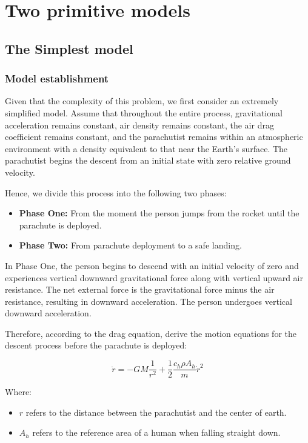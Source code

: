 \documentclass[12pt]{article}
\begin{document}
\section{Two primitive models}

\subsection{The Simplest model}

\subsubsection{Model establishment}

Given that the complexity of this problem, 
we first consider an extremely simplified model.  
Assume that throughout the entire process, gravitational acceleration remains constant, air density 
remains constant, the air drag coefficient remains constant, and the parachutist 
remains within an atmospheric environment with a density equivalent to that near the
Earth's surface. The parachutist begins the descent from an initial state with zero 
relative ground velocity. 

Hence, we divide this process into the following two phases:

\begin{itemize}
    \item \textbf{Phase One:} From the moment the person jumps from the rocket until the parachute is deployed.
    \item \textbf{Phase Two:} From parachute deployment to a safe landing.
\end{itemize}

In Phase One, the person begins to descend with an initial velocity of zero and experiences vertical downward gravitational force along with vertical upward air resistance. 
The net external force is the gravitational force minus the air resistance, resulting in downward acceleration. The person undergoes vertical downward acceleration.

Therefore, according to the drag equation\cite{enwiki:1144175318}, derive the motion equations for the descent process before the parachute is deployed: 

\[ \ddot{r} = - GM\frac{1}{r^2} + \frac{1}{2}\frac{c_h\rho A_h}{m}\dot{r}^2\]

Where: 
\begin{itemize}
    \item $r$ refers to the distance between the parachutist and the center of earth. 
    \item $A_h$ refers to the reference area of a human when falling straight down.
\end{itemize}
\end{document}
